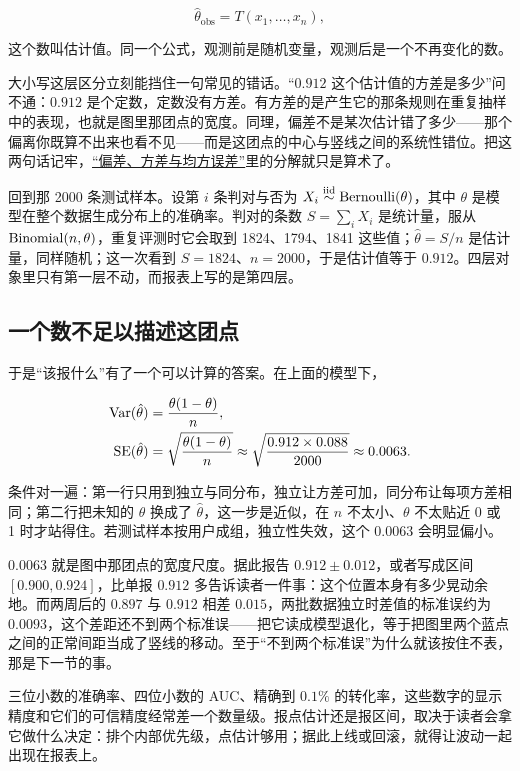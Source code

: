 \[
\hat\theta_{\mathrm{obs}}=T(x_1,\ldots,x_n),
\]

这个数叫估计值。同一个公式，观测前是随机变量，观测后是一个不再变化的数。

大小写这层区分立刻能挡住一句常见的错话。``\(0.912\) 这个估计值的方差是多少''问不通：\(0.912\) 是个定数，定数没有方差。有方差的是产生它的那条规则在重复抽样中的表现，也就是图里那团点的宽度。同理，偏差不是某次估计错了多少——那个偏离你既算不出来也看不见——而是这团点的中心与竖线之间的系统性错位。把这两句话记牢，\hyperref[sec:11-Mathematical-Statistics/02-Point-Estimation/01]{``偏差、方差与均方误差''}里的分解就只是算术了。

回到那 2000 条测试样本。设第 \(i\) 条判对与否为 \(X_i\overset{\mathrm{iid}}{\sim}\operatorname{Bernoulli}(\theta)\)，其中 \(\theta\) 是模型在整个数据生成分布上的准确率。判对的条数 \(S=\sum_i X_i\) 是统计量，服从 \(\operatorname{Binomial}(n,\theta)\)，重复评测时它会取到 1824、1794、1841 这些值；\(\hat\theta=S/n\) 是估计量，同样随机；这一次看到 \(S=1824\)、\(n=2000\)，于是估计值等于 \(0.912\)。四层对象里只有第一层不动，而报表上写的是第四层。

\subsection{一个数不足以描述这团点}

于是``该报什么''有了一个可以计算的答案。在上面的模型下，

\[
\begin{aligned}
\operatorname{Var}(\hat\theta)&=\frac{\theta(1-\theta)}{n},\\
\operatorname{SE}(\hat\theta)&=\sqrt{\frac{\theta(1-\theta)}{n}}\approx\sqrt{\frac{0.912\times0.088}{2000}}\approx0.0063.
\end{aligned}
\]

条件对一遍：第一行只用到独立与同分布，独立让方差可加，同分布让每项方差相同；第二行把未知的 \(\theta\) 换成了 \(\hat\theta\)，这一步是近似，在 \(n\) 不太小、\(\theta\) 不太贴近 0 或 1 时才站得住。若测试样本按用户成组，独立性失效，这个 \(0.0063\) 会明显偏小。

\(0.0063\) 就是图中那团点的宽度尺度。据此报告 \(0.912\pm0.012\)，或者写成区间 \([0.900,0.924]\)，比单报 \(0.912\) 多告诉读者一件事：这个位置本身有多少晃动余地。而两周后的 \(0.897\) 与 \(0.912\) 相差 \(0.015\)，两批数据独立时差值的标准误约为 \(0.0093\)，这个差距还不到两个标准误——把它读成模型退化，等于把图里两个蓝点之间的正常间距当成了竖线的移动。至于``不到两个标准误''为什么就该按住不表，那是下一节的事。

三位小数的准确率、四位小数的 AUC、精确到 \(0.1\%\) 的转化率，这些数字的显示精度和它们的可信精度经常差一个数量级。报点估计还是报区间，取决于读者会拿它做什么决定：排个内部优先级，点估计够用；据此上线或回滚，就得让波动一起出现在报表上。

